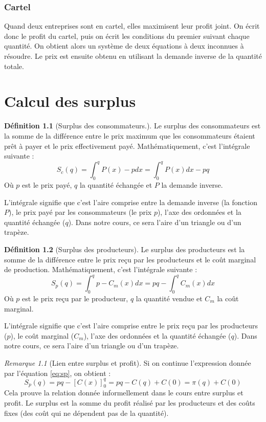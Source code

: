 \documentclass[
  a4paper,
]{book}
\theoremstyle{definition}
\newtheorem{definition}{Définition}[chapter]
\theoremstyle{definition}
\theoremstyle{definition}
\theoremstyle{definition}
\theoremstyle{remark}
\newtheorem*{remark}{Remarque}
\begin{document}
\hypertarget{cartel}{%
\subsection{Cartel}\label{cartel}}

Quand deux entreprises sont en cartel, elles maximisent leur profit joint.
On écrit donc le profit du cartel, puis on écrit les conditions du premier suivant chaque quantité.
On obtient alors un système de deux équations à deux inconnues à résoudre.
Le prix est ensuite obtenu en utilisant la demande inverse de la quantité totale.

\hypertarget{calcul-des-surplus}{%
\chapter{Calcul des surplus}\label{calcul-des-surplus}}

\begin{definition}[Surplus des consommateurs.]
Le surplus des consommateurs est la somme de la différence entre le prix maximum que les consommateurs étaient prêt à payer et le prix effectivement payé.
Mathématiquement, c'est l'intégrale suivante :
\[
S_c(q)=\int_0^qP(x)-pdx=\int_0^qP(x)dx-pq
\]
Où \(p\) est le prix payé, \(q\) la quantité échangée et \(P\) la demande inverse.
\end{definition}

L'intégrale signifie que c'est l'aire comprise entre la demande inverse (la fonction \(P\)), le prix payé par les consommateurs (le prix \(p\)), l'axe des ordonnées et la quantité échangée (\(q\)).
Dans notre cours, ce sera l'aire d'un triangle ou d'un trapèze.

\begin{definition}[Surplus des producteurs]
Le surplus des producteurs est la somme de la différence entre le prix reçu par les producteurs et le coût marginal de production.
Mathématiquement, c'est l'intégrale suivante :
\[
S_p(q)=\int_0^qp-C_m(x)dx=pq-\int_0^qC_m(x)dx \label{eq:sp}
\]
Où \(p\) est le prix reçu par le producteur, \(q\) la quantité vendue et \(C_m\) la coût marginal.
\end{definition}

L'intégrale signifie que c'est l'aire comprise entre le prix reçu par les producteurs (\(p\)), le coût marginal (\(C_m\)), l'axe des ordonnées et la quantité échangée (\(q\)).
Dans notre cours, ce sera l'aire d'un triangle ou d'un trapèze.

\begin{remark}[Lien entre surplus et profit]
Si on continue l'expression donnée par l'équation \eqref{eq:sp}, on obtient :
\[S_p(q)=pq-\left[C(x)\right]_0^q=pq-C(q)+C(0)=\pi(q)+C(0)\]
Cela prouve la relation donnée informellement dans le cours entre surplus et profit.
Le surplus est la somme du profit réalisé par les producteurs et des coûts fixes (des coût qui ne dépendent pas de la quantité).
\end{remark}
\end{document}

